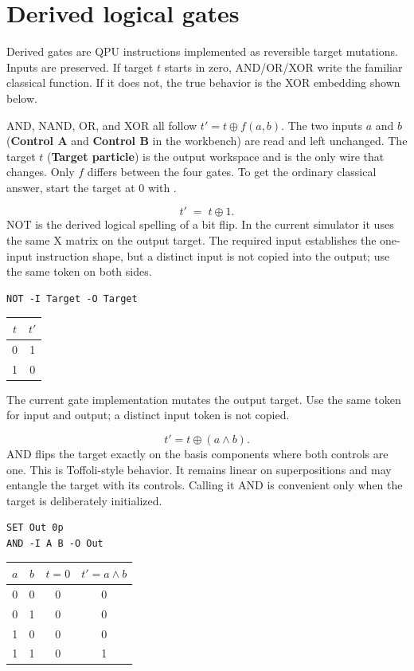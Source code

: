 \section{Derived logical gates}

Derived gates are QPU instructions implemented as reversible target
mutations. Inputs are preserved. If target $t$ starts in zero, AND/OR/XOR
write the familiar classical function. If it does not, the true behavior is
the XOR embedding shown below.

\begin{beginnerbox}
AND, NAND, OR, and XOR all follow $t' = t\oplus f(a,b)$. The two inputs $a$
and $b$ (\textbf{Control A} and \textbf{Control B} in the workbench) are read
and left unchanged. The target $t$ (\textbf{Target particle}) is the output
workspace and is the only wire that changes. Only $f$ differs between the
four gates. To get the ordinary classical answer, start the target at 0 with
.
\end{beginnerbox}


\[
t'\;=\;t\oplus1.
\]
NOT is the derived logical spelling of a bit flip. In the current simulator it
uses the same X matrix on the output target. The required input establishes the
one-input instruction shape, but a distinct input is not copied into the
output; use the same token on both sides.
\begin{lstlisting}
NOT -I Target -O Target
\end{lstlisting}
\begin{center}
\begin{tabular}{c|c}\toprule $t$&$t'$\\\midrule0&1\\1&0\\\bottomrule\end{tabular}
\end{center}
The current gate implementation mutates the output target. Use the same token
for input and output; a distinct input token is not copied.


\[
t'=t\oplus(a\land b).
\]
AND flips the target exactly on the basis components where both controls are
one. This is Toffoli-style behavior. It remains linear on superpositions and
may entangle the target with its controls. Calling it AND is convenient only
when the target is deliberately initialized.
\begin{lstlisting}
SET Out 0p
AND -I A B -O Out
\end{lstlisting}
\begin{center}
\begin{tabular}{cc|c|c}\toprule $a$&$b$&$t=0$&$t'=a\land b$\\\midrule
0&0&0&0\\0&1&0&0\\1&0&0&0\\1&1&0&1\\\bottomrule
\end{tabular}
\end{center}

